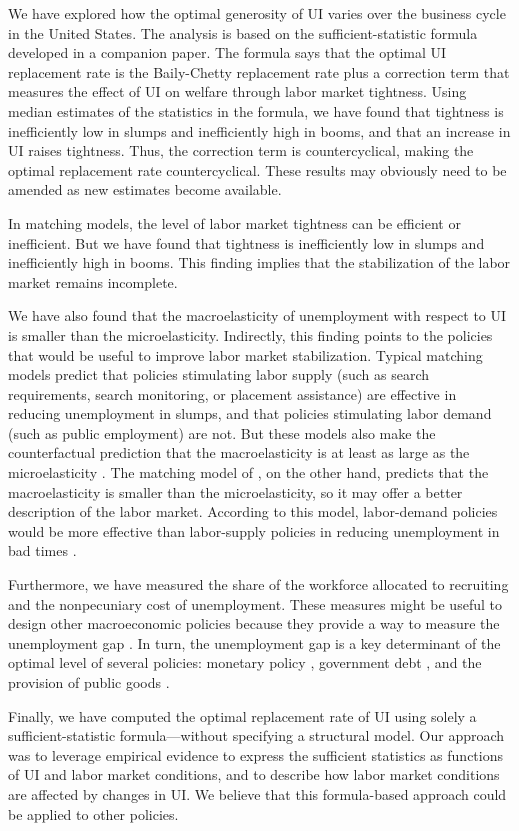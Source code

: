 \documentclass[letterpaper,12pt,leqno]{article}
\def\path{../}
\begin{document}
We have explored how the optimal generosity of UI varies over the business cycle in the United States. The analysis is based on the sufficient-statistic formula developed in a companion paper. The formula says that the optimal UI replacement rate is the Baily-Chetty replacement rate plus a correction term that measures the effect of UI on welfare through labor market tightness. Using median estimates of the statistics in the formula, we have found that tightness is inefficiently low in slumps and inefficiently high in booms, and that an increase in UI raises tightness. Thus, the correction term is countercyclical, making the optimal replacement rate countercyclical. These results may obviously need to be amended as new estimates become available.

In matching models, the level of labor market tightness can be efficient or inefficient. But we have found that tightness is inefficiently low in slumps and inefficiently high in booms. This finding implies that the stabilization of the labor market remains incomplete.

We have also found that the macroelasticity of unemployment with respect to UI is smaller than the microelasticity. Indirectly, this finding points to the policies that would be useful to improve labor market stabilization. Typical matching models predict that policies stimulating labor supply (such as search requirements, search monitoring, or placement assistance) are effective in reducing unemployment in slumps, and that policies stimulating labor demand (such as public employment) are not. But these models also make the counterfactual prediction that the macroelasticity is at least as large as the microelasticity \citep{LMS10}. The matching model of \citet{M09}, on the other hand, predicts that the macroelasticity is smaller than the microelasticity, so it may offer a better description of the labor market. According to this model, labor-demand policies would be more effective than labor-supply policies in reducing unemployment in bad times \citep{M09,M12}.

Furthermore, we have measured the share of the workforce allocated to recruiting and the nonpecuniary cost of unemployment. These measures  might be useful to design other macroeconomic policies because they provide a way to measure the unemployment gap \citep{MS16}. In turn, the unemployment gap is a key determinant of the optimal level of several policies: monetary policy \citep{MS16}, government debt \citep{MS14}, and the provision of public goods \citep{MS15}.

Finally, we have computed the optimal replacement rate of UI using solely a sufficient-statistic formula---without specifying a structural model. Our approach was to leverage empirical evidence to express the sufficient statistics as functions of UI and labor market conditions, and to describe how labor market conditions are affected by changes in UI. We believe that this formula-based approach could be applied to other policies.


\end{document}
